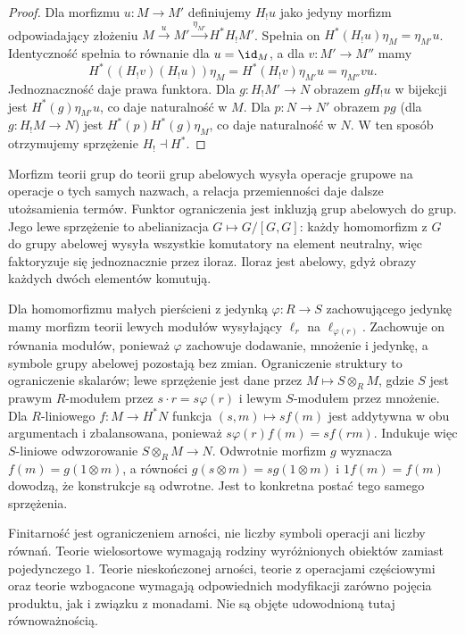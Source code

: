 \begin{proof}
Dla morfizmu $u:M\to M'$ definiujemy $H_!u$ jako jedyny morfizm odpowiadający złożeniu $M\xrightarrow{u}M'\xrightarrow{\eta_{M'}}H^*H_!M'$. Spełnia on $H^*(H_!u)\eta_M=\eta_{M'}u$. Identyczność spełnia to równanie dla $u=\id_M$, a dla $v:M'\to M''$ mamy
\[
 H^*((H_!v)(H_!u))\eta_M
 =H^*(H_!v)\eta_{M'}u=\eta_{M''}vu.
\]
Jednoznaczność daje prawa funktora. Dla $g:H_!M'\to N$ obrazem $gH_!u$ w bijekcji jest $H^*(g)\eta_{M'}u$, co daje naturalność w $M$. Dla $p:N\to N'$ obrazem $pg$ (dla $g:H_!M\to N$) jest $H^*(p)H^*(g)\eta_M$, co daje naturalność w $N$. W ten sposób otrzymujemy sprzężenie $H_!\dashv H^*$.
\end{proof}

\begin{przyklad}\label{cat:ex:lawvere-change}
Morfizm teorii grup do teorii grup abelowych wysyła operacje grupowe na operacje o tych samych nazwach, a relacja przemienności daje dalsze utożsamienia termów. Funktor ograniczenia jest inkluzją grup abelowych do grup. Jego lewe sprzężenie to abelianizacja $G\mapsto G/[G,G]$: każdy homomorfizm z $G$ do grupy abelowej wysyła wszystkie komutatory na element neutralny, więc faktoryzuje się jednoznacznie przez iloraz. Iloraz jest abelowy, gdyż obrazy każdych dwóch elementów komutują.

Dla homomorfizmu małych pierścieni z jedynką $\varphi:R\to S$ zachowującego jedynkę mamy morfizm teorii lewych modułów wysyłający $\ell_r$ na $\ell_{\varphi(r)}$. Zachowuje on równania modułów, ponieważ $\varphi$ zachowuje dodawanie, mnożenie i jedynkę, a symbole grupy abelowej pozostają bez zmian. Ograniczenie struktury to ograniczenie skalarów; lewe sprzężenie jest dane przez $M\mapsto S\otimes_R M$, gdzie $S$ jest prawym $R$-modułem przez $s\cdot r=s\varphi(r)$ i lewym $S$-modułem przez mnożenie. Dla $R$-liniowego $f:M\to H^*N$ funkcja $(s,m)\mapsto sf(m)$ jest addytywna w obu argumentach i zbalansowana, ponieważ $s\varphi(r)f(m)=sf(rm)$. Indukuje więc $S$-liniowe odwzorowanie $S\otimes_R M\to N$. Odwrotnie morfizm $g$ wyznacza $f(m)=g(1\otimes m)$, a równości $g(s\otimes m)=sg(1\otimes m)$ i $1f(m)=f(m)$ dowodzą, że konstrukcje są odwrotne. Jest to konkretna postać tego samego sprzężenia.
\end{przyklad}

\begin{uwaga}\label{cat:rem:lawvere-scope}
Finitarność jest ograniczeniem arności, nie liczby symboli operacji ani liczby równań. Teorie wielosortowe wymagają rodziny wyróżnionych obiektów zamiast pojedynczego $1$. Teorie nieskończonej arności, teorie z operacjami częściowymi oraz teorie wzbogacone wymagają odpowiednich modyfikacji zarówno pojęcia produktu, jak i związku z monadami. Nie są objęte udowodnioną tutaj równoważnością.
\end{uwaga}

